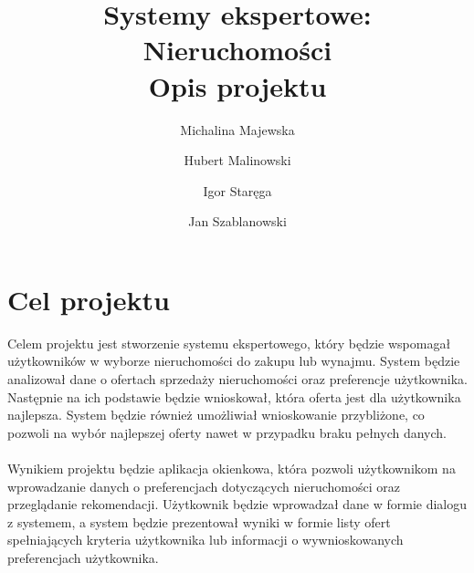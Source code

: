 \documentclass{article}
\title{Systemy ekspertowe: Nieruchomości \\ \large{Opis projektu}}
\author{Michalina Majewska
	\and Hubert Malinowski
	\and Igor Staręga
	\and Jan Szablanowski}
\begin{document}
\maketitle

\section{Cel projektu}
Celem projektu jest stworzenie systemu ekspertowego, który będzie wspomagał użytkowników w wyborze nieruchomości do zakupu lub wynajmu. System będzie analizował dane o ofertach sprzedaży nieruchomości oraz preferencje użytkownika. Następnie na ich podstawie będzie wnioskował, która oferta jest dla użytkownika najlepsza. System będzie również umożliwiał wnioskowanie przybliżone, co pozwoli na wybór najlepszej oferty nawet w przypadku braku pełnych danych.
\\ \\
Wynikiem projektu będzie aplikacja okienkowa, która pozwoli użytkownikom na wprowadzanie danych o preferencjach dotyczących nieruchomości oraz przeglądanie rekomendacji. Użytkownik będzie wprowadzał dane w formie dialogu z systemem, a system będzie prezentował wyniki w formie listy ofert spełniających kryteria użytkownika lub informacji o wywnioskowanych preferencjach użytkownika.




\end{document}
